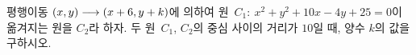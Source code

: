 평행이동 $(x{,}\mkern3mu\mathopen{}y)\longrightarrow(x+6{,}\mkern3mu\mathopen{}y+k)$에 의하여 원~$C_1:\ x^2+y^2+10x-4y+25=0$이 옮겨지는 원을 $C_2$라 하자. 두 원~$C_1$, $C_2$의 중심 사이의 거리가 $10$일 때, 양수 $k$의 값을 구하시오.
